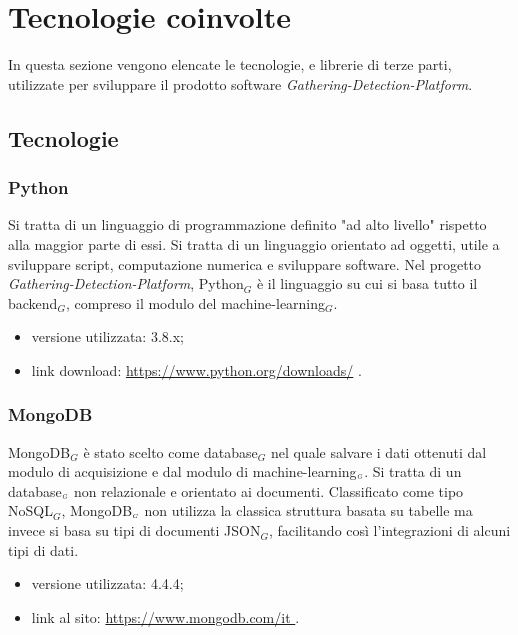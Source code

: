 \chapter{Tecnologie coinvolte}\label{TecnologieCoinvolte}
In questa sezione vengono elencate le tecnologie, e librerie di terze parti, utilizzate per sviluppare il prodotto software \textit{Gathering-Detection-Platform}.

\section{Tecnologie}\label{Tecnologie}
\subsection{Python}\label{TecnologiePython}
Si tratta di un linguaggio di programmazione definito "ad alto livello" rispetto alla maggior parte di essi.
Si tratta di un linguaggio orientato ad oggetti, utile a sviluppare script, computazione numerica e sviluppare software.
Nel progetto \textit{Gathering-Detection-Platform}, Python$_G$ è il linguaggio su cui si basa tutto il backend$_G$, compreso il modulo del machine-learning$_G$.

\begin{itemize}
  \item versione utilizzata: 3.8.x;
  \item link download: \url{https://www.python.org/downloads/} .
\end{itemize}

\subsection{MongoDB}\label{TecnologieMongoDB}
MongoDB$_G$ è stato scelto come database$_G$ nel quale salvare i dati ottenuti dal modulo di acquisizione e dal modulo di machine-learning$_{\scaleto{G}{3pt}}$.
Si tratta di un database$_{\scaleto{G}{3pt}}$ non relazionale e orientato ai documenti.
Classificato come tipo NoSQL$_G$, MongoDB$_{\scaleto{G}{3pt}}$ non utilizza la classica struttura basata su tabelle ma invece si basa su tipi di documenti JSON$_G$, facilitando così l'integrazioni di alcuni tipi di dati.

\begin{itemize}
    \item versione utilizzata: 4.4.4;
    \item link al sito: \url{https://www.mongodb.com/it }.
\end{itemize}

